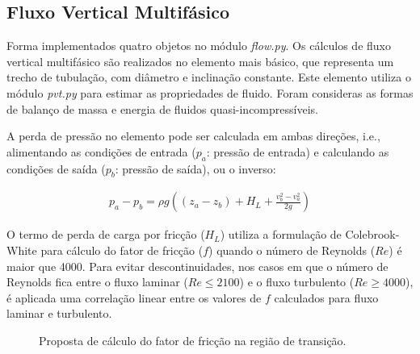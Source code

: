 \documentclass[final,5p]{elsarticle}
\numberwithin{equation}{section}
\begin{document}
    \subsection{Fluxo Vertical Multifásico}

        Forma implementados quatro objetos no módulo \emph{flow.py}. Os cálculos de fluxo vertical multifásico são realizados no elemento mais básico, que representa um trecho de tubulação, com diâmetro e inclinação constante. Este elemento utiliza o módulo \emph{pvt.py} para estimar as propriedades de fluido. Foram consideras as formas de balanço de massa e energia de fluidos quasi-incompressíveis.

        A perda de pressão no elemento pode ser calculada em ambas direções, i.e., alimentando as condições de entrada ($p_a$: pressão de entrada) e calculando as condições de saída ($p_b$: pressão de saída), ou o inverso:

        \begin{align}
            p_a - p_b = \rho g \left( (z_a - z_b) + H_L + \frac{v^2_b - v^2_a}{2 g}\right)
        \end{align}

        O termo de perda de carga por fricção ($H_L$) utiliza a formulação de Colebrook-White para cálculo do fator de fricção ($f$) quando o número de Reynolds ($Re$) é maior que 4000. Para evitar descontinuidades, nos casos em que o número de Reynolds fica entre o fluxo laminar ($Re \leq 2100$) e o fluxo turbulento ($Re \geq 4000$), é aplicada uma correlação linear entre os valores de $f$ calculados para fluxo laminar e turbulento.

        \begin{figure}[hbt!]
            \caption{Proposta de cálculo do fator de fricção na região de transição.}
            \label{fig:friccao}
        \end{figure}
\end{document}
